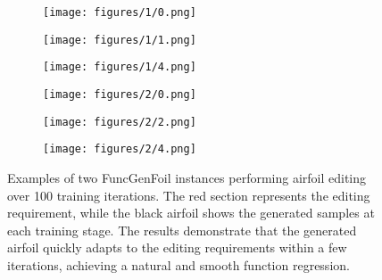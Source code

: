 \begin{figure}[t]
    \centering
    \begin{subfigure}{0.15\textwidth}
        \texttt{[image: figures/1/0.png]}
    \end{subfigure}\hfill
    \begin{subfigure}{0.15\textwidth}
        \texttt{[image: figures/1/1.png]}
    \end{subfigure}\hfill
    \begin{subfigure}{0.15\textwidth}
        \texttt{[image: figures/1/4.png]}
    \end{subfigure}

    \vspace{-2em}

    \begin{subfigure}{0.15\textwidth}
        \texttt{[image: figures/2/0.png]}
    \end{subfigure}\hfill
    \begin{subfigure}{0.15\textwidth}
        \texttt{[image: figures/2/2.png]}
    \end{subfigure}\hfill
    \begin{subfigure}{0.15\textwidth}
        \texttt{[image: figures/2/4.png]}
    \end{subfigure}

    \caption{Examples of two FuncGenFoil instances performing airfoil editing over 100 training iterations. The red section represents the editing requirement, while the black airfoil shows the generated samples at each training stage. The results demonstrate that the generated airfoil quickly adapts to the editing requirements within a few iterations, achieving a natural and smooth function regression.}
    \vspace{-15pt}
    \label{fig:airfoil_edit_finetuning}
\end{figure}